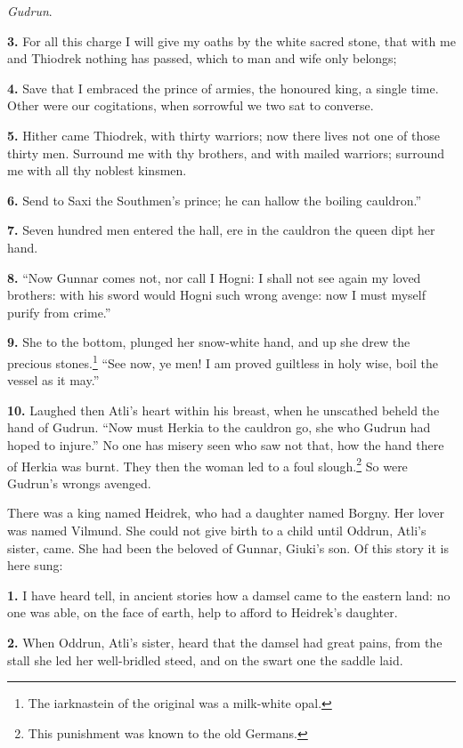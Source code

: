 \emph{Gudrun}.

\textbf{3.} For all this charge I will give my oaths by the white sacred
stone, that with me and Thiodrek nothing has passed, which to man and
wife only belongs;

\textbf{4.} Save that I embraced the prince of armies, the honoured king, a
single time. Other were our cogitations, when sorrowful we two sat to
converse.

\textbf{5.} Hither came Thiodrek, with thirty warriors; now there lives not
one of those thirty men. Surround me with thy brothers, and with
mailed warriors; surround me with all thy noblest kinsmen.

\textbf{6.} Send to Saxi the Southmen's prince; he can hallow the boiling
cauldron.''

\textbf{7.} Seven hundred men entered the hall, ere in the cauldron the queen
dipt her hand.

\textbf{8.} ``Now Gunnar comes not, nor call I Hogni: I shall not see again my
loved brothers: with his sword would Hogni such wrong avenge: now I
must myself purify from crime.''

\textbf{9.} She to the bottom, plunged her snow-white hand, and up she drew
the precious stones.\footnote{The iarknastein of the original was a milk-white opal.} ``See now, ye men! I am proved guiltless in
holy wise, boil the vessel as it may.''

\textbf{10.} Laughed then Atli's heart within his breast, when he unscathed
beheld the hand of Gudrun. ``Now must Herkia to the cauldron go, she
who Gudrun had hoped to injure.'' No one has misery seen who saw not
that, how the hand there of Herkia was burnt. They then the woman led
to a foul slough.\footnote{This punishment was known to the old Germans.} So were Gudrun's wrongs avenged.


There was a king named Heidrek, who had a daughter named Borgny. Her
lover was named Vilmund. She could not give birth to a child until
Oddrun, Atli's sister, came. She had been the beloved of Gunnar,
Giuki's son. Of this story it is here sung:

\textbf{1.} I have heard tell, in ancient stories how a damsel came to the
eastern land: no one was able, on the face of earth, help to afford to
Heidrek's daughter.

\textbf{2.} When Oddrun, Atli's sister, heard that the damsel had great
pains, from the stall she led her well-bridled steed, and on the swart
one the saddle laid.

